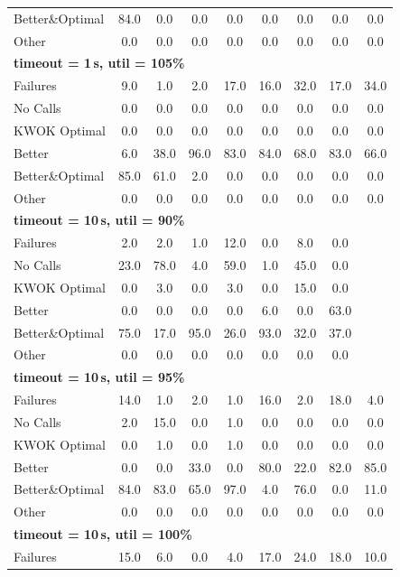 \begin{tabular}{l cccccccc}
Better\&Optimal & 84.0 & 0.0 & 0.0 & 0.0 & 0.0 & 0.0 & 0.0 & 0.0 \\
Other & 0.0 & 0.0 & 0.0 & 0.0 & 0.0 & 0.0 & 0.0 & 0.0 \\
\midrule
\multicolumn{9}{l}{\textbf{timeout = 1\,s, util = 105\%}} \\
\midrule
Failures & 9.0 & 1.0 & 2.0 & 17.0 & 16.0 & 32.0 & 17.0 & 34.0 \\
No Calls & 0.0 & 0.0 & 0.0 & 0.0 & 0.0 & 0.0 & 0.0 & 0.0 \\
KWOK Optimal & 0.0 & 0.0 & 0.0 & 0.0 & 0.0 & 0.0 & 0.0 & 0.0 \\
Better & 6.0 & 38.0 & 96.0 & 83.0 & 84.0 & 68.0 & 83.0 & 66.0 \\
Better\&Optimal & 85.0 & 61.0 & 2.0 & 0.0 & 0.0 & 0.0 & 0.0 & 0.0 \\
Other & 0.0 & 0.0 & 0.0 & 0.0 & 0.0 & 0.0 & 0.0 & 0.0 \\
\midrule
\multicolumn{9}{l}{\textbf{timeout = 10\,s, util = 90\%}} \\
\midrule
Failures & 2.0 & 2.0 & 1.0 & 12.0 & 0.0 & 8.0 & 0.0 & \text{--} \\
No Calls & 23.0 & 78.0 & 4.0 & 59.0 & 1.0 & 45.0 & 0.0 & \text{--} \\
KWOK Optimal & 0.0 & 3.0 & 0.0 & 3.0 & 0.0 & 15.0 & 0.0 & \text{--} \\
Better & 0.0 & 0.0 & 0.0 & 0.0 & 6.0 & 0.0 & 63.0 & \text{--} \\
Better\&Optimal & 75.0 & 17.0 & 95.0 & 26.0 & 93.0 & 32.0 & 37.0 & \text{--} \\
Other & 0.0 & 0.0 & 0.0 & 0.0 & 0.0 & 0.0 & 0.0 & \text{--} \\
\midrule
\multicolumn{9}{l}{\textbf{timeout = 10\,s, util = 95\%}} \\
\midrule
Failures & 14.0 & 1.0 & 2.0 & 1.0 & 16.0 & 2.0 & 18.0 & 4.0 \\
No Calls & 2.0 & 15.0 & 0.0 & 1.0 & 0.0 & 0.0 & 0.0 & 0.0 \\
KWOK Optimal & 0.0 & 1.0 & 0.0 & 1.0 & 0.0 & 0.0 & 0.0 & 0.0 \\
Better & 0.0 & 0.0 & 33.0 & 0.0 & 80.0 & 22.0 & 82.0 & 85.0 \\
Better\&Optimal & 84.0 & 83.0 & 65.0 & 97.0 & 4.0 & 76.0 & 0.0 & 11.0 \\
Other & 0.0 & 0.0 & 0.0 & 0.0 & 0.0 & 0.0 & 0.0 & 0.0 \\
\midrule
\multicolumn{9}{l}{\textbf{timeout = 10\,s, util = 100\%}} \\
\midrule
Failures & 15.0 & 6.0 & 0.0 & 4.0 & 17.0 & 24.0 & 18.0 & 10.0 \\

\end{tabular}
